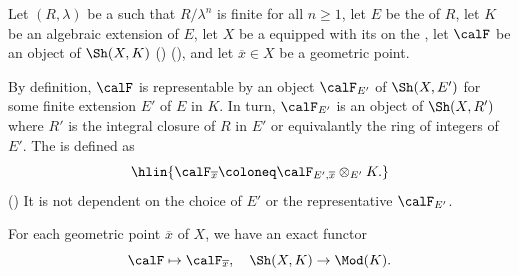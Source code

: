 \begin{definition} \label{definition:geometric_stalk_of_an_etale_lambda_adic_sheaf_on_a_scheme_with_rational_coefficients}
    Let $(R, \lambda)$ be a   such that $R/\lambda^n$ is finite for all $n \geq 1$, let $E$ be the  of $R$, let $K$ be an algebraic extension of $E$, let $X$ be a  equipped with its on the , let $\calF$ be an object of $\Sh(X, K)$ () (), and let $\overline{x} \in X$ be a geometric point.

    By definition, $\calF$ is representable by an object $\calF_{E'}$ of $\Sh(X,E')$ for some finite extension $E'$ of $E$ in $K$. In turn, $\calF_{E'}$ is an object of $\Sh(X, R')$ where $R'$ is the integral closure of $R$ in $E'$ or equivalantly the ring of integers of $E'$. The  is defined as
    $$\hlin{\calF_{\overline{x}} \coloneq \calF_{E',\overline{x}} \otimes_{E'} K.}$$
    ()
    It is not dependent on the choice of $E'$ or the representative $\calF_{E'}$. 

    For each geometric point $\overline{x}$ of $X$, we have an exact functor
    $$\calF \mapsto \calF_{\overline{x}}, \quad \Sh(X,K) \to \Mod(K).$$
\end{definition}